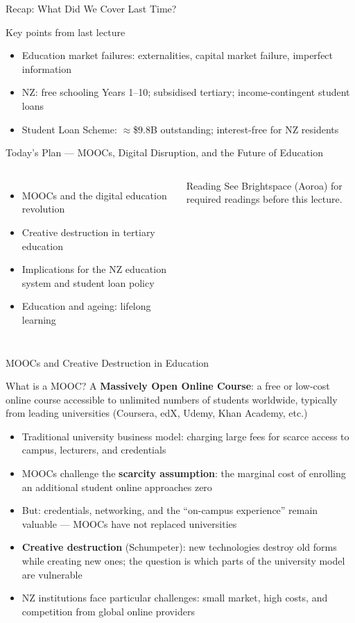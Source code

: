 \documentclass[aspectratio=169, 12pt]{beamer}
\newcommand{\recapslide}[1]{%
  \begin{frame}{Recap: What Did We Cover Last Time?}
    \begin{block}{Key points from last lecture}
      \begin{itemize}#1\end{itemize}
    \end{block}
  \end{frame}}
\newcommand{\planslide}[2]{%
  \begin{frame}{Today's Plan — #1}
    \begin{columns}
      \column{0.6\textwidth}
      \begin{itemize}#2\end{itemize}
      \column{0.38\textwidth}
      \begin{alertblock}{Reading}
        \footnotesize See Brightspace (Aoroa) for required readings before this lecture.
      \end{alertblock}
    \end{columns}
  \end{frame}}
\begin{document}
\recapslide{
  \item Education market failures: externalities, capital market failure, imperfect information
  \item NZ: free schooling Years 1--10; subsidised tertiary; income-contingent student loans
  \item Student Loan Scheme: $\approx$\$9.8B outstanding; interest-free for NZ residents
}

\planslide{MOOCs, Digital Disruption, and the Future of Education}{
  \item MOOCs and the digital education revolution
  \item Creative destruction in tertiary education
  \item Implications for the NZ education system and student loan policy
  \item Education and ageing: lifelong learning
}

\begin{frame}{MOOCs and Creative Destruction in Education}
  \begin{block}{What is a MOOC?}
    A \textbf{Massively Open Online Course}: a free or low-cost online course accessible to
    unlimited numbers of students worldwide, typically from leading universities (Coursera, edX,
    Udemy, Khan Academy, etc.)
  \end{block}
  \begin{itemize}
    \item Traditional university business model: charging large fees for scarce access to
          campus, lecturers, and credentials
    \item MOOCs challenge the \textbf{scarcity assumption}: the marginal cost of enrolling
          an additional student online approaches zero
    \item But: credentials, networking, and the ``on-campus experience'' remain valuable
          --- MOOCs have not replaced universities
    \item \textbf{Creative destruction} (Schumpeter): new technologies destroy old forms
          while creating new ones; the question is which parts of the university model are
          vulnerable
    \item NZ institutions face particular challenges: small market, high costs, and competition
          from global online providers
  \end{itemize}
\end{frame}
\end{document}
